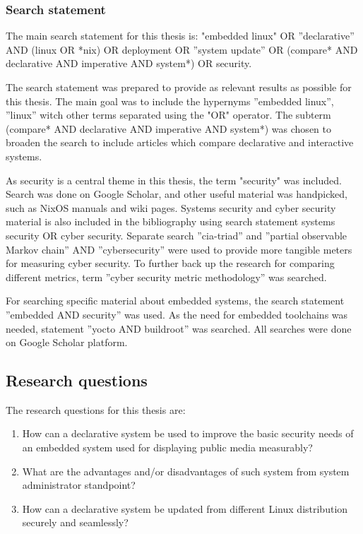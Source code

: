 \subsubsection{Search statement} \label{searchstatement}

The main search statement for this thesis is: "embedded linux" OR
''declarative'' AND (linux OR *nix) OR deployment OR ''system update''
OR (compare* AND declarative AND imperative AND system*) OR security.

The search statement was prepared to provide as relevant results as
possible for this thesis. The main goal was to include the hypernyms
''embedded linux'', ''linux'' witch other terms separated using the
"OR" operator. The subterm (compare* AND declarative AND imperative
AND system*) was chosen to broaden the search to include articles
which compare declarative and interactive systems.

As security is a central theme in this thesis, the term "security" was
included. Search was done on Google Scholar, and other useful material
was handpicked, such as NixOS manuals and wiki pages. Systems security
and cyber security material is also included in the bibliography using
search statement systems security OR cyber security. Separate search
''cia-triad'' and ''partial observable Markov chain'' AND
''cybersecurity'' were used to provide more tangible meters for
measuring cyber security. To further back up the research for
comparing different metrics, term ''cyber security metric
methodology'' was searched.

For searching specific material about embedded systems, the search
statement ''embedded AND security'' was used. As the need for embedded
toolchains was needed, statement ''yocto AND buildroot'' was
searched. All searches were done on Google Scholar platform.

\subsection{Research questions} \label{resquest}

The research questions for this thesis are:

\begin{enumerate}
\item How can a declarative system be used to improve the basic
  security needs of an embedded system used for displaying public
  media measurably?
\item What are the advantages and/or disadvantages of such system from
  system administrator standpoint?
\item How can a declarative system be updated from different Linux
  distribution securely and seamlessly?
\end{enumerate}

